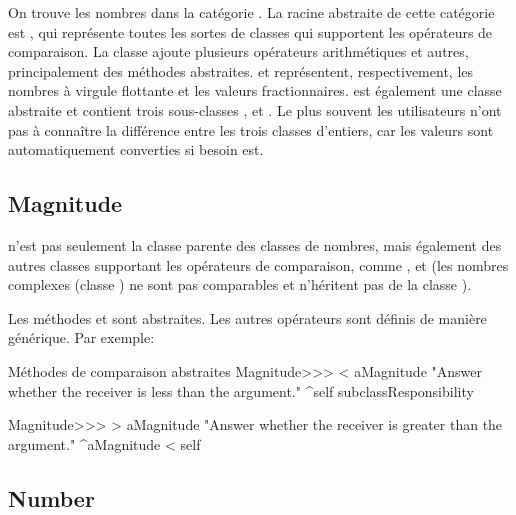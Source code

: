 \documentclass[a4paper,10pt,twoside]{book}
\begin{document}
On trouve les nombres dans la cat\'egorie . La racine abstraite de cette cat\'egorie est , qui repr\'esente toutes les sortes de classes qui supportent les op\'erateurs de comparaison. La classe  ajoute plusieurs op\'erateurs arithm\'etiques et autres, principalement des m\'ethodes abstraites.  et  repr\'esentent, respectivement, les nombres \`a virgule flottante et les valeurs fractionnaires.   est \'egalement une classe abstraite et contient trois sous-classes ,  et . Le plus souvent les utilisateurs n'ont pas \`a conna\^itre la diff\'erence entre les trois classes d'entiers, car les valeurs sont automatiquement converties si besoin est.

\subsection{Magnitude}

 n'est pas seulement la classe parente des classes de nombres, mais \'egalement des autres classes supportant les op\'erateurs de comparaison, comme ,  et  (les nombres complexes (classe ) ne sont pas comparables et n'h\'eritent pas de la classe ).

Les m\'ethodes  et  sont abstraites. Les autres op\'erateurs sont d\'efinis de mani\`ere g\'en\'erique. Par exemple:

\begin{method}{M\'ethodes de comparaison abstraites}
Magnitude>>> < aMagnitude 
    "Answer whether the receiver is less than the argument."
    ^self subclassResponsibility

Magnitude>>> > aMagnitude 
    "Answer whether the receiver is greater than the argument."
    ^aMagnitude < self
\end{method}

\subsection{Number}
\end{document}
